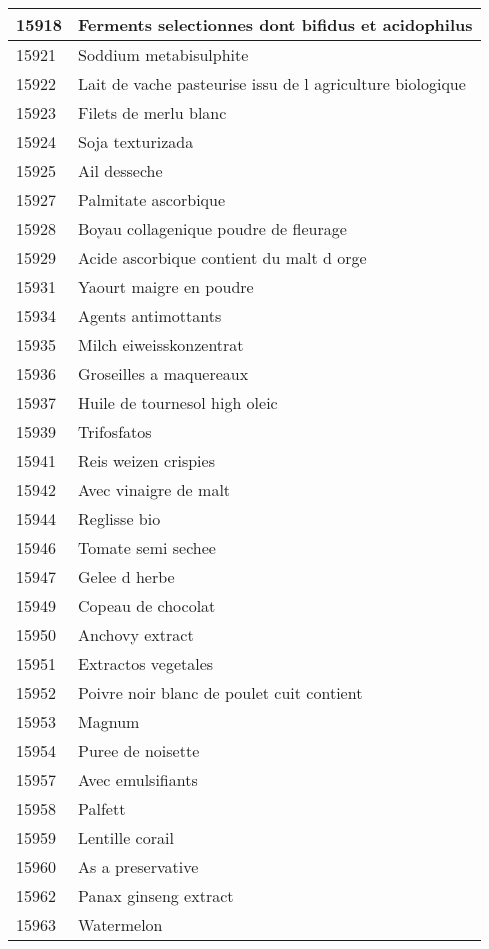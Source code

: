 \begin{longtable}{|l|l|}
15918 & Ferments selectionnes dont bifidus et acidophilus \\ \hline 
15921 & Soddium metabisulphite \\ \hline 
15922 & Lait de vache pasteurise issu de l agriculture biologique \\ \hline 
15923 & Filets de merlu blanc \\ \hline 
15924 & Soja texturizada \\ \hline 
15925 & Ail desseche \\ \hline 
15927 & Palmitate ascorbique \\ \hline 
15928 & Boyau collagenique poudre de fleurage \\ \hline 
15929 & Acide ascorbique contient du malt d orge \\ \hline 
15931 & Yaourt maigre en poudre \\ \hline 
15934 & Agents antimottants \\ \hline 
15935 & Milch eiweisskonzentrat \\ \hline 
15936 & Groseilles a maquereaux \\ \hline 
15937 & Huile de tournesol high oleic \\ \hline 
15939 & Trifosfatos \\ \hline 
15941 & Reis weizen crispies \\ \hline 
15942 & Avec vinaigre de malt \\ \hline 
15944 & Reglisse bio \\ \hline 
15946 & Tomate semi sechee \\ \hline 
15947 & Gelee d herbe \\ \hline 
15949 & Copeau de chocolat \\ \hline 
15950 & Anchovy extract \\ \hline 
15951 & Extractos vegetales \\ \hline 
15952 & Poivre noir blanc de poulet cuit contient \\ \hline 
15953 & Magnum \\ \hline 
15954 & Puree de noisette \\ \hline 
15957 & Avec emulsifiants \\ \hline 
15958 & Palfett \\ \hline 
15959 & Lentille corail \\ \hline 
15960 & As a preservative \\ \hline 
15962 & Panax ginseng extract \\ \hline 
15963 & Watermelon \\ \hline 

\end{longtable}
